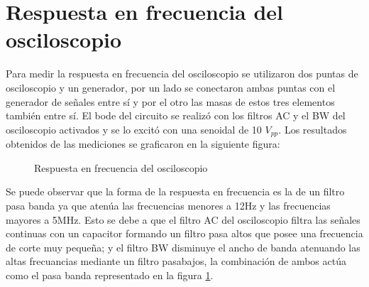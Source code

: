 \section{Respuesta en frecuencia del osciloscopio}

Para medir la respuesta en frecuencia del osciloscopio se utilizaron
dos puntas de osciloscopio y un generador, por un lado se conectaron
ambas puntas con el generador de señales entre sí y por el otro las
masas de estos tres elementos también entre sí. El bode del circuito
se realizó con los filtros AC y el BW del osciloscopio activados y
se lo excitó con una senoidal de 10 $V_{pp}$. Los resultados obtenidos
de las mediciones se graficaron en la siguiente figura:
\begin{figure}[H]
\caption{Respuesta en frecuencia del osciloscopio}
\label{fig:rtaosc}
\end{figure}

Se puede observar que la forma de la respuesta en frecuencia es la
de un filtro pasa banda ya que atenúa las frecuencias menores a 12Hz
y las frecuencias mayores a 5MHz. Esto se debe a que el filtro AC
del osciloscopio filtra las señales continuas con un capacitor formando
un filtro pasa altos que posee una frecuencia de corte muy pequeña; y el
filtro BW disminuye el ancho de banda atenuando las altas frecuancias
mediante un filtro pasabajos, la combinación de ambos actúa como
el pasa banda representado en la figura \ref{fig:rtaosc}.

